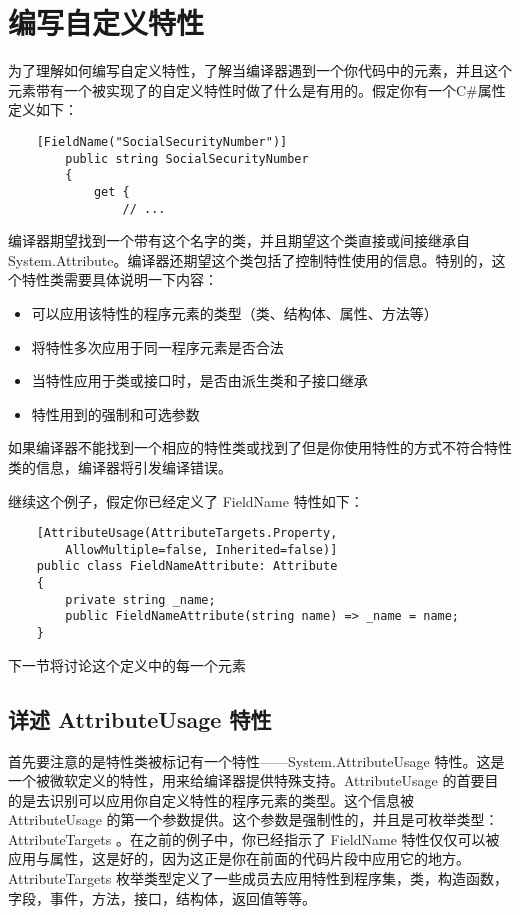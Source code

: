 \section{编写自定义特性}
为了理解如何编写自定义特性，了解当编译器遇到一个你代码中的元素，并且这个元素带有一个被实现了的自定义特性时做了什么是有用的。假定你有一个C\#属性定义如下：
\begin{verbatim}
    [FieldName("SocialSecurityNumber")]
        public string SocialSecurityNumber
        {
            get {
                // ...
\end{verbatim}
编译器期望找到一个带有这个名字的类，并且期望这个类直接或间接继承自 System.Attribute。编译器还期望这个类包括了控制特性使用的信息。特别的，这个特性类需要具体说明一下内容：
\begin{itemize}
    \item 可以应用该特性的程序元素的类型（类、结构体、属性、方法等）
    \item 将特性多次应用于同一程序元素是否合法
    \item 当特性应用于类或接口时，是否由派生类和子接口继承
    \item 特性用到的强制和可选参数
\end{itemize}
如果编译器不能找到一个相应的特性类或找到了但是你使用特性的方式不符合特性类的信息，编译器将引发编译错误。

继续这个例子，假定你已经定义了 FieldName 特性如下：
\begin{verbatim}
    [AttributeUsage(AttributeTargets.Property,
        AllowMultiple=false, Inherited=false)]
    public class FieldNameAttribute: Attribute
    {
        private string _name;
        public FieldNameAttribute(string name) => _name = name;
    }
\end{verbatim}
下一节将讨论这个定义中的每一个元素

\subsection{详述 AttributeUsage 特性}
首先要注意的是特性类被标记有一个特性——System.AttributeUsage 特性。这是一个被微软定义的特性，用来给编译器提供特殊支持。AttributeUsage 的首要目的是去识别可以应用你自定义特性的程序元素的类型。这个信息被 AttributeUsage 的第一个参数提供。这个参数是强制性的，并且是可枚举类型：AttributeTargets 。在之前的例子中，你已经指示了 FieldName 特性仅仅可以被应用与属性，这是好的，因为这正是你在前面的代码片段中应用它的地方。AttributeTargets 枚举类型定义了一些成员去应用特性到程序集，类，构造函数，字段，事件，方法，接口，结构体，返回值等等。

